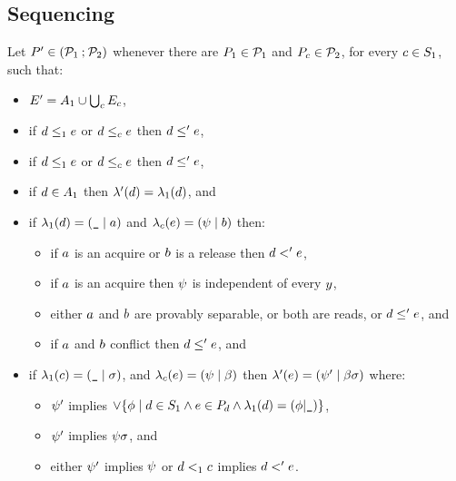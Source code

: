 \subsection{Sequencing}
\begin{definition}
  \label{def:semi:seq}
  Let $P' \in (\mathcal{P}_1 \mathbin; \mathcal{P}_2)$ whenever there are
  $P_1 \in \mathcal{P}_1$ and $P_{c}\in\mathcal{P}_2$, for every
  $c\in S_1$, such that:
\begin{itemize}
\item $E' = A_1 \cup \bigcup_{c}E_{c}$,
\item if $d \le_1 e$ or $d\le_{c} e$ then $d \le' e$,
\item if $d \leq_1 e$ or $d\leq_{c} e$ then $d \leq' e$,
\item if $d\in A_1$ then $\lambda'(d) = \lambda_1(d)$, and
\item if $\lambda_1(d) = (\texttt{\_} \mid a)$ and
  $\lambda_{c}(e) = (\psi \mid b)$ then:
  \begin{itemize}
  \item if $a$ is an acquire or $b$ is a release then $d <' e$,
  \item if $a$ is an acquire then $\psi$ is independent of every $y$,
  \item either $a$ and $b$ are provably separable, or both are reads, or
    $d \leq' e$, and
  \item if $a$ and $b$ conflict
    then $d \leq' e$, and
  \end{itemize}
\item 
  if
  $\lambda_1(c) = (\texttt{\_} \mid \sigma)$, and
  $\lambda_{c}(e) = (\psi \mid \beta)$ then
  $\lambda'(e) = (\psi' \mid \beta\sigma)$ where:
  \begin{itemize}
  \item $\psi'$ implies
    $\lor\{\phi\mid d\in S_1 \land e\in P\!_{d}
    \land \lambda_1(d)=(\phi{\mid}\texttt{\_})\}$,
  \item $\psi'$ implies $\psi\sigma$, and
  \item either $\psi'$ implies $\psi$ or $d<_1c$ implies $d<'e$.
  \end{itemize}
\end{itemize}
\end{definition}


